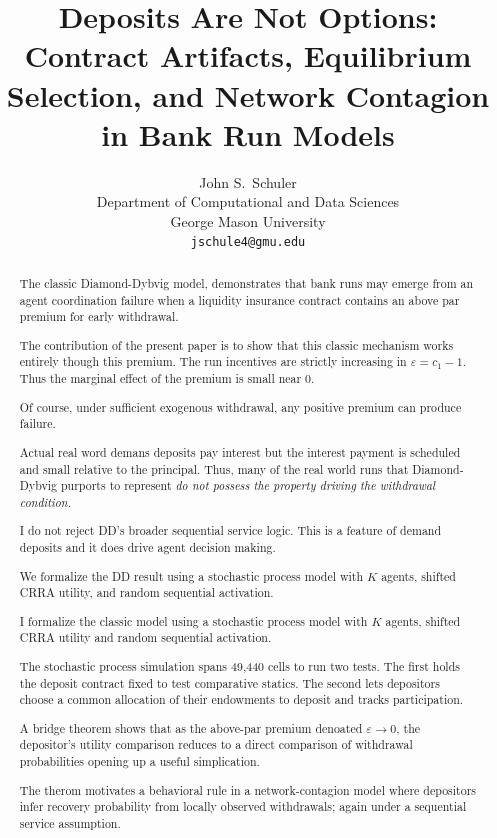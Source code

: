 \documentclass[12pt]{article}\usepackage[]{graphicx}\usepackage[]{xcolor}
\title{Deposits Are Not Options: Contract Artifacts, Equilibrium
       Selection, and Network Contagion in Bank Run Models}
\author{John S.\ Schuler\\
        \small Department of Computational and Data Sciences\\
        \small George Mason University\\
        \small \texttt{jschule4@gmu.edu}}
\date{}
\begin{document}

\maketitle

\begin{abstract}

The classic Diamond-Dybvig model, \citet{diamond1983bank} demonstrates that bank runs may emerge from an agent coordination failure when a liquidity insurance contract contains an above par premium for early withdrawal.


The contribution of the present paper is to show that this classic mechanism works entirely though this premium.
The run incentives are strictly increasing in $\varepsilon = c_1 - 1$.
Thus the marginal effect of the premium is small near 0.



Of course, under sufficient exogenous withdrawal, any positive premium can produce failure.

Actual real word demans deposits pay interest but the interest payment is scheduled and small relative to the principal. 
Thus, many of the real world runs that Diamond-Dybvig purports to represent \emph{do not possess the property driving the withdrawal condition.}


I do not reject DD's broader sequential service logic. This is a feature of demand deposits and it does drive agent decision making.

We formalize the DD result using a stochastic process model with $K$ agents, shifted CRRA utility, and random sequential 
activation.

I formalize the classic model using a stochastic process model with $K$ agents, shifted CRRA utility and random sequential activation.

The stochastic process simulation spans 49{,}440 cells to run two tests.  
The first holds the deposit contract fixed to test comparative statics. 
The second lets depositors choose a common allocation of their endowments to deposit and tracks participation.


A bridge theorem shows that as the above-par premium denoated $\varepsilon \to 0$, the depositor's utility comparison reduces to a direct comparison of 
withdrawal probabilities opening up a useful simplication.

The therom motivates a behavioral rule in a network-contagion model where depositors infer recovery probability from
locally observed withdrawals; again under a sequential service assumption.



\end{abstract}
\end{document}
